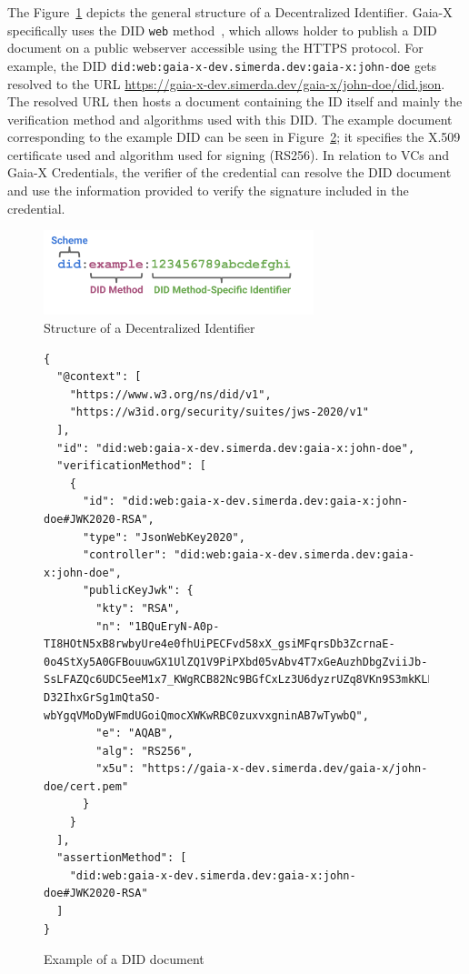 The Figure~\ref{fig:did_structure} depicts the general structure of a Decentralized Identifier.
Gaia-X specifically uses the DID \texttt{web} method~\cite{didweb}, which allows holder to publish a DID document on a public webserver accessible using the HTTPS protocol.
For example, the DID \texttt{did:web:gaia-x-dev.simerda.dev:gaia-x:john-doe} gets resolved to the URL \url{https://gaia-x-dev.simerda.dev/gaia-x/john-doe/did.json}.
The resolved URL then hosts a document containing the ID itself and mainly the verification method and algorithms used with this DID.
The example document corresponding to the example DID can be seen in Figure~\ref{fig:did_document}; it specifies the X.509 certificate used and algorithm used for signing (RS256).
In relation to VCs and Gaia-X Credentials, the verifier of the credential can resolve the DID document and use the information provided to verify the signature included in the credential.

\begin{figure}
    \centering
    \includegraphics[width=0.7\textwidth]{figures/parts-of-a-did.png}
    \caption{Structure of a Decentralized Identifier~\cite{did}}\label{fig:did_structure}
\end{figure}

\begin{figure}
\centering
\begin{verbatim}
{
  "@context": [
    "https://www.w3.org/ns/did/v1",
    "https://w3id.org/security/suites/jws-2020/v1"
  ],
  "id": "did:web:gaia-x-dev.simerda.dev:gaia-x:john-doe",
  "verificationMethod": [
    {
      "id": "did:web:gaia-x-dev.simerda.dev:gaia-x:john-doe#JWK2020-RSA",
      "type": "JsonWebKey2020",
      "controller": "did:web:gaia-x-dev.simerda.dev:gaia-x:john-doe",
      "publicKeyJwk": {
        "kty": "RSA",
        "n": "1BQuEryN-A0p-TI8HOtN5xB8rwbyUre4e0fhUiPECFvd58xX_gsiMFqrsDb3ZcrnaE-0o4StXy5A0GFBouuwGX1UlZQ1V9PiPXbd05vAbv4T7xGeAuzhDbgZviiJb-SsLFAZQc6UDC5eeM1x7_KWgRCB82Nc9BGfCxLz3U6dyzrUZq8VKn9S3mkKLLuslewa00X8TCHEAVQFEktVV9F617GXEknrEZhKoZfPeuiweMj4FxuamBRQPaZlCWQduiDnVkmNu4pr7C7HJQkBxxH-D32IhxGrSg1mQtaSO-wbYgqVMoDyWFmdUGoiQmocXWKwRBC0zuxvxgninAB7wTywbQ",
        "e": "AQAB",
        "alg": "RS256",
        "x5u": "https://gaia-x-dev.simerda.dev/gaia-x/john-doe/cert.pem"
      }
    }
  ],
  "assertionMethod": [
    "did:web:gaia-x-dev.simerda.dev:gaia-x:john-doe#JWK2020-RSA"
  ]
}
\end{verbatim}
\caption{Example of a DID document}\label{fig:did_document}
\end{figure}

